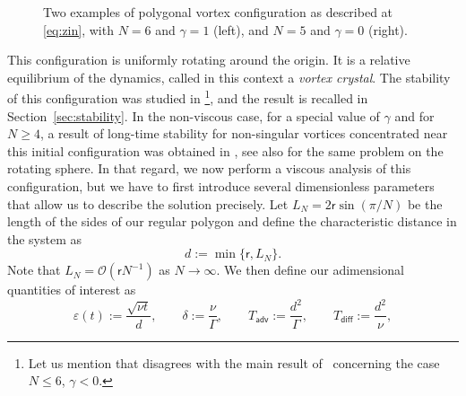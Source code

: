 \documentclass[11pt,reqno,a4paper]{amsart}
\def\eps{\varepsilon}
\newcommand{\cO}{\mathcal{O}}
\newcommand{\adv}{\mathsf{adv}}
\newcommand{\diff}{\mathsf{diff}}
\newcommand{\1}{\mathbbm{1}}
\theoremstyle{definition}
\theoremstyle{definition}
\numberwithin{equation}{section}
\begin{document}
\begin{figure}
    
    \centering
    \caption{Two examples of polygonal vortex configuration as described at \cref{eq:zin}, with $N=6$ and $\gamma = 1$ (left), and $N=5$ and $\gamma =0$ (right).}
    \label{fig:crystal1}
\end{figure}
This configuration is uniformly rotating around the origin. It is a relative equilibrium of the dynamics, called in this context a \emph{vortex crystal}. The stability of this configuration was studied in \cite{CabSch1999}\footnote{Let us mention that \cite{LP05} disagrees with the main result of~\cite{CabSch1999} concerning the case $N \le 6$, $\gamma < 0$.}, and the result is recalled in Section~\ref{sec:stability}. In the non-viscous case, for a special value of $\gamma$ and for $N \ge 4$, a result of long-time stability for non-singular vortices concentrated near this initial configuration was obtained in \cite{Donati_2025_Crystal}, see also \cite{DR26} for the same problem on the rotating sphere. In that regard, we now perform a viscous analysis of this configuration, but we have to first introduce several dimensionless parameters that allow us to describe the solution precisely. Let $L_N=2\mathsf{r}\sin(\pi/N)$ be the length of the sides of our regular polygon and define the characteristic distance in the system as
\begin{equation}
\label{def:d}
    d:=\min\{ \mathsf{r},L_N\}.
\end{equation}
Note that $L_N=\cO(\mathsf{r}N^{-1})$ as $N\to \infty$. We then define our adimensional quantities of interest as
\begin{equation}
\label{def:adpar}
    \eps(t):=\frac{\sqrt{\nu t}}{d}, \qquad \delta:=\frac{\nu}{\Gamma}, \qquad T_\adv:=\frac{d^2}{\Gamma}, \qquad T_\diff:=\frac{d^2}{\nu},
\end{equation}
\end{document}
